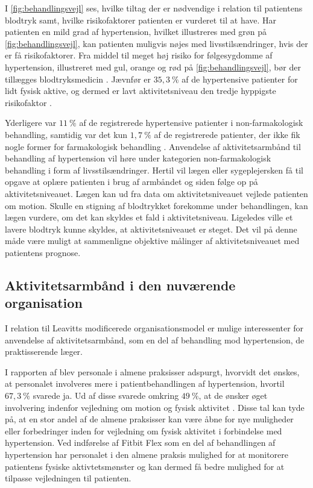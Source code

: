 \noindent
I \autoref{fig:behandlingsvejl} ses, hvilke tiltag der er nødvendige i relation til patientens blodtryk samt, hvilke risikofaktorer patienten er vurderet til at have. Har patienten en mild grad af hypertension, hvilket illustreres med grøn på \autoref{fig:behandlingsvejl}, kan patienten muligvis nøjes med livsstilsændringer, hvis der er få risikofaktorer. Fra middel til meget høj risiko for følgesygdomme af hypertension, illustreret med gul, orange og rød på \autoref{fig:behandlingsvejl}, bør der tillægges blodtryksmedicin \citep{bech2015}.
Jævnfør \citeauthor{munck2007} er $35,3~\%$ af de hypertensive patienter for lidt fysisk aktive, og dermed er lavt aktivitetsniveau den tredje hyppigste risikofaktor \citep{munck2007}.

Yderligere var $11~\%$ af de registrerede hypertensive patienter i non-farmakologisk behandling, samtidig var det kun $1,7~\%$ af de registrerede patienter, der ikke fik nogle former for farmakologisk behandling \citep{munck2007}.
Anvendelse af aktivitetsarmbånd til behandling af hypertension vil høre under kategorien non-farmakologisk behandling i form af livsstilsændringer. Hertil vil lægen eller sygeplejersken få til opgave at oplære patienten i brug af armbåndet og siden følge op på aktivitetsniveauet. Lægen kan ud fra data om aktivitetsniveauet vejlede patienten om motion. 
Skulle en stigning af blodtrykket forekomme under behandlingen, kan lægen vurdere, om det kan skyldes et fald i aktivitetsniveau. Ligeledes ville et lavere blodtryk kunne skyldes, at aktivitetsniveauet er steget. Det vil på denne måde være muligt at sammenligne objektive målinger af aktivitetsniveauet med patientens prognose. 

\subsection{Aktivitetsarmbånd i den nuværende organisation}
I relation til Leavitts modificerede organisationsmodel er mulige interessenter for anvendelse af aktivitetsarmbånd, som en del af behandling mod hypertension, de praktisserende læger.

I rapporten af \citeauthor{munck2007} blev personale i almene praksisser adspurgt, hvorvidt det ønskes, at personalet involveres mere i patientbehandlingen af hypertension, hvortil $67,3~\%$ svarede ja. Ud af disse svarede omkring $49~\%$, at de ønsker øget involvering indenfor vejledning om motion og fysisk aktivitet \citep{munck2007}. Disse tal kan tyde på, at en stor andel af de almene praksisser kan være åbne for nye muligheder eller forbedringer inden for vejledning om fysisk aktivitet i forbindelse med hypertension. Ved indførelse af Fitbit Flex som en del af behandlingen af hypertension har personalet i den almene praksis mulighed for at monitorere patientens fysiske aktivtetsmønster og kan dermed få bedre mulighed for at tilpasse vejledningen til patienten. 

